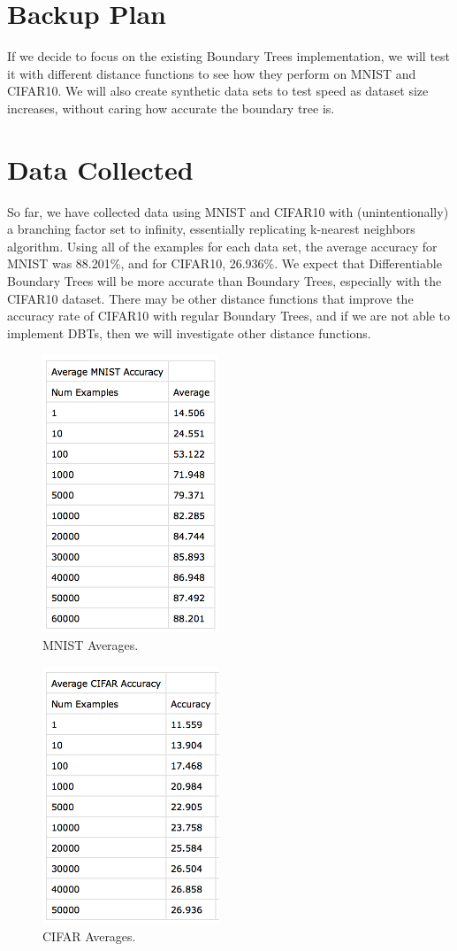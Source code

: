 \documentclass[10pt,letterpaper]{article}
\begin{document}
		\section{Backup Plan}
		If we decide to focus on the existing Boundary Trees implementation, we will test it with different distance functions to see how they perform on MNIST and CIFAR10. We will also create synthetic data sets to test speed as dataset size increases, without caring how accurate the boundary tree is.
	
	\section{Data Collected}
		So far, we have collected data using MNIST and CIFAR10 with (unintentionally) a branching factor set to infinity, essentially replicating k-nearest neighbors algorithm. Using all of the examples for each data set, the average accuracy for MNIST was 88.201\%, and for CIFAR10, 26.936\%. We expect that Differentiable Boundary Trees will be more accurate than Boundary Trees, especially with the CIFAR10 dataset. There may be other distance functions that improve the accuracy rate of CIFAR10 with regular Boundary Trees, and if we are not able to implement DBTs, then we will investigate other distance functions.
			\begin{figure}
			\includegraphics[width=150pt]{1.png}
			\caption{MNIST Averages.}
			\label{fig:1}
		\end{figure}
		\begin{figure}
			\includegraphics[width=150pt]{2.png}
			\caption{CIFAR Averages.}
			\label{fig:2}
		\end{figure}
\end{document}
